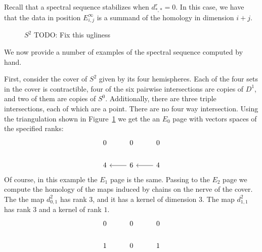 Recall that a spectral sequence stabilizes when $d^r_{*,*} = 0$. In this case, we have that the data in position $E^\infty_{i,j}$ is a summand of the homology in dimension $i+j$. 
\begin{figure}
\centering
{}
\caption{$S^2$ TODO: Fix this ugliness}
\label{fig:S2-triangulation}
\end{figure}
We now provide a number of examples of the spectral sequence computed by hand.
\begin{example}
First, consider the cover of $S^2$ given by its four hemispheres. Each of the four sets in the cover is contractible, four of the six pairwise intersections are copies of $D^1$, and two of them are copies of $S^0$. Additionally, there are three triple intersections, each of which are a point. There are no four way intersection. Using the triangulation shown in Figure~\ref{fig:S2-triangulation} we get the an $E_0$ page with vectors spaces of the specified ranks:
\[ \begin{tikzcd}
0    &  0     &   0   \\
4    & \arrow{l}  6     & \arrow{l}   4
\end{tikzcd} \]
Of course, in this example the $E_1$ page is the same.
Passing to the $E_2$ page we compute the homology of the maps induced by chains on the nerve of the cover. The the map $d^2_{0,1}$ has rank 3, and it has a kernel of dimension 3. The map $d^2_{1,1}$ has rank 3 and a kernel of rank $1$.
\[ \begin{tikzcd}
0    &  0     &   0   \\
1    &  0     &   1
\end{tikzcd} \]
\end{example}


